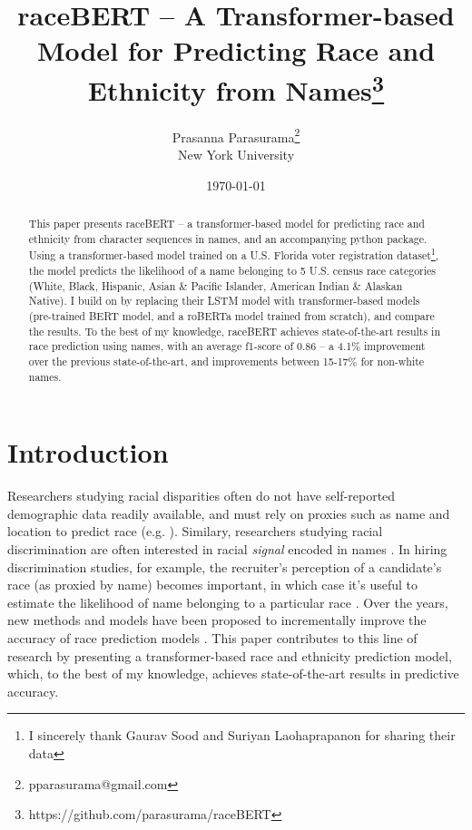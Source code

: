 \documentclass[11pt]{article}
\begin{document}
\title{raceBERT -- A Transformer-based Model for Predicting Race and Ethnicity from Names\footnote{https://github.com/parasurama/raceBERT}}
\author{Prasanna Parasurama\thanks{pparasurama@gmail.com} \\ New York University}
\date{\today}
\maketitle

\begin{abstract}
 This paper presents raceBERT -- a transformer-based model for predicting race and ethnicity from character sequences in names, and an accompanying python package.
 Using a transformer-based model trained on a U.S. Florida voter registration dataset\footnote{I sincerely thank Gaurav Sood and Suriyan Laohaprapanon for sharing their data}, the model predicts the likelihood of a name belonging to 5 U.S. census race categories (White, Black, Hispanic, Asian \& Pacific Islander, American Indian \& Alaskan Native).
 I build on \textcite{sood_predicting_2018} by replacing their LSTM model with transformer-based models (pre-trained BERT model, and a roBERTa model trained from scratch), and compare the results.
 To the best of my knowledge, raceBERT achieves state-of-the-art results in race prediction using names, with an average f1-score of 0.86 -- a 4.1\% improvement over the previous state-of-the-art, and improvements between 15-17\% for non-white names.
\end{abstract}

\section{Introduction}

Researchers studying racial disparities often do not have self-reported demographic data readily available, and must rely on proxies such as name and location to predict race (e.g. \textcite{zhang_assessing_2018,fiscella_use_2006}).
Similary, researchers studying racial discrimination are often interested in racial \textit{signal} encoded in names \parencite{bertrand_are_2004,kang_whitened_2016}. 
In hiring discrimination studies, for example, the recruiter's perception of a candidate's race (as proxied by name) becomes important, in which case it's useful to estimate the likelihood of name belonging to a particular race \parencite{parasurama_who_2020}. 
Over the years, new methods and models have been proposed to incrementally improve the accuracy of race prediction models \parencite{fiscella_use_2006,imai_improving_2016,ambekar_name-ethnicity_2009,sood_predicting_2018,xie_rethnicity_2021}.
This paper contributes to this line of research by presenting a transformer-based race and ethnicity prediction model, which, to the best of my knowledge, achieves state-of-the-art results in predictive accuracy. 
\end{document}
